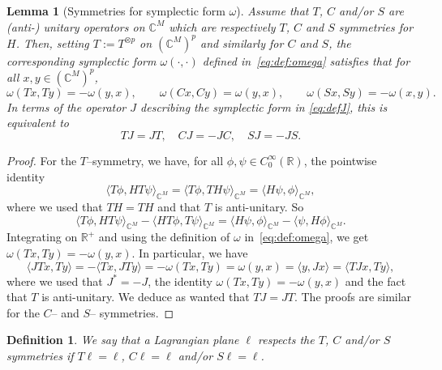 \documentclass[11pt]{amsart}
\numberwithin{equation}{section} %
\newtheorem{lemma}[theorem]{Lemma}
\newtheorem{definition}[theorem]{Definition}
\newcommand\1{{\mathds 1}}
\def\C{{\mathbb C}}
\def\R{{\mathbb R}}
\def\bra{\langle}
\def\ket{\rangle}
\begin{document}
\begin{lemma}[Symmetries for symplectic form $\omega$]
    Assume that $T$, $C$ and/or $S$ are (anti-) unitary operators on $\C^M$ which are respectively $T$, $C$ and $S$ symmetries for $H$. Then, setting $T := T^{\otimes p}$ on $(\C^M)^p$ and similarly for $C$ and $S$, the corresponding symplectic form $\omega(\cdot, \cdot)$ defined in~\eqref{eq:def:omega} satisfies that for all $x, y \in (\C^M)^p$,
    \begin{equation} \label{eq:TCS_omega}
        \boxed{ \omega(Tx, Ty) = - \omega(y,x), \qquad \omega(Cx, Cy) = \omega(y,x), \qquad \omega(Sx, Sy) = -\omega(x,y). }
    \end{equation}
    In terms of the operator $J$ describing the symplectic form in \eqref{eq:defJ}, this is equivalent to
    \begin{equation} \label{eq:TCS_with_J}
        \boxed{ TJ = JT, \quad CJ = - JC, \quad S J = - JS.}
    \end{equation}
\end{lemma}
\begin{proof}
    For the $T$--symmetry, we have, for all $\phi, \psi \in C^\infty_0(\R)$, the pointwise identity
    \[
        \bra T \phi, H T \psi \ket_{\C^M} = \bra T \phi, T H \psi \ket_{\C^M} = \bra H \psi, \phi \ket_{\C^M},
    \]
    where we used that $TH = TH$ and that $T$ is anti-unitary. So
    \[
         \bra T \phi, H T \psi \ket_{\C^M} -  \bra H T \phi, T \psi \ket_{\C^M} = \bra H \psi, \phi \ket_{\C^M} -  \bra \psi, H \phi \ket_{\C^M}.
    \]
    Integrating on $\R^+$ and using the definition of $\omega$ in~\eqref{eq:def:omega}, we get $\omega(Tx, Ty) = - \omega(y,x)$. In particular, we have
    \[
        \bra J Tx, Ty \ket = - \bra Tx, JTy \ket = - \omega(Tx, Ty) = \omega(y,x) = \bra y, Jx \ket = \bra TJx, Ty \ket,
    \]
    where we used that $J^* = -J$, the identity $\omega(Tx, Ty) = -\omega(y,x)$ and the fact that $T$ is anti-unitary. We deduce as wanted that $TJ = JT$. The proofs are similar for the $C$-- and $S$-- symmetries.
\end{proof}

\begin{definition}
We say that a Lagrangian plane $\ell$ respects the $T$, $C$ and/or $S$ symmetries if $T \ell = \ell$, $C \ell = \ell$ and/or $S \ell = \ell$.
\end{definition} 
\end{document}
